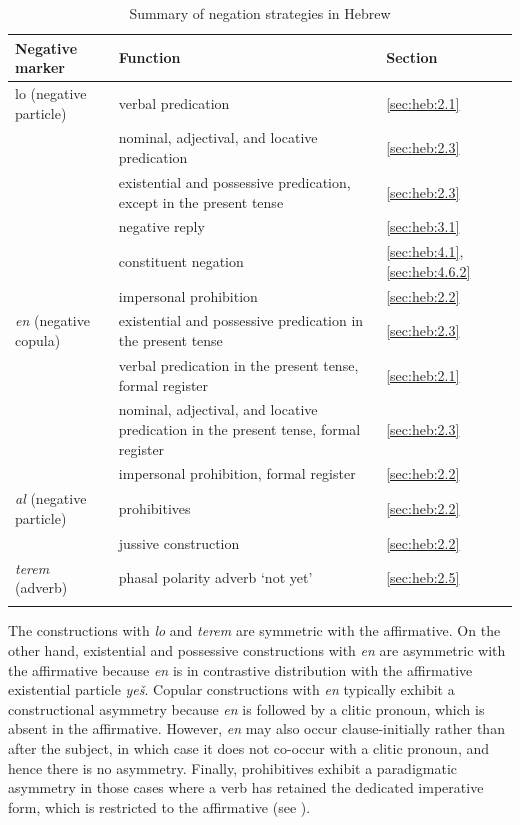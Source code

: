 \documentclass[output=paper,colorlinks,citecolor=brown]{langscibook}
\begin{document}
\begin{table}
    \centering\small
    \begin{tabularx}{\textwidth}{lQl}
         
\lsptoprule
Negative marker & Function & Section\\
\midrule
lo (negative particle) 
    & verbal predication & \ref{sec:heb:2.1} \\
\tablevspace
    & nominal, adjectival, and locative predication  & \ref{sec:heb:2.3}  \\
\tablevspace
    & existential and possessive predication, except in the present tense  & \ref{sec:heb:2.3}  \\
\tablevspace
    & negative reply  & \ref{sec:heb:3.1}   \\
\tablevspace
    & constituent negation  & \ref{sec:heb:4.1}, \ref{sec:heb:4.6.2}  \\
\tablevspace
    & impersonal prohibition  & \ref{sec:heb:2.2}  \\
\midrule
\textit{en} (negative copula) 
    & existential and possessive predication in the present tense  & \ref{sec:heb:2.3}  \\
\tablevspace
    & verbal predication in the present tense, formal register  & \ref{sec:heb:2.1}  \\
\tablevspace
    & nominal, adjectival, and locative predication in the present tense, formal register  & \ref{sec:heb:2.3}  \\
\tablevspace
    & impersonal prohibition, formal register  & \ref{sec:heb:2.2}  \\
\midrule
\textit{al} (negative particle) 
    & prohibitives  & \ref{sec:heb:2.2}  \\
\tablevspace
    & jussive construction  & \ref{sec:heb:2.2}  \\
\midrule
\textit{terem} (adverb) 
	& phasal polarity adverb ‘not yet’ & \ref{sec:heb:2.5}  \\
\lspbottomrule
    \end{tabularx}
    \caption{Summary of negation strategies in Hebrew}
    \label{tab:heb:1}
\end{table}

The constructions with \textit{lo} and \textit{terem} are symmetric with the affirmative. On the other hand, existential and possessive constructions with \textit{en} are asymmetric with the affirmative because \textit{en} is in contrastive distribution with the affirmative existential particle \textit{yeš}. Copular constructions with \textit{en} typically exhibit a constructional asymmetry because \textit{en} is followed by a clitic pronoun, which is absent in the affirmative. However, \textit{en} may also occur clause-initially rather than after the subject, in which case it does not co-occur with a clitic pronoun, and hence there is no asymmetry. Finally, prohibitives exhibit a paradigmatic asymmetry in those cases where a verb has retained the dedicated imperative form, which is restricted to the affirmative (see ).
\end{document}
